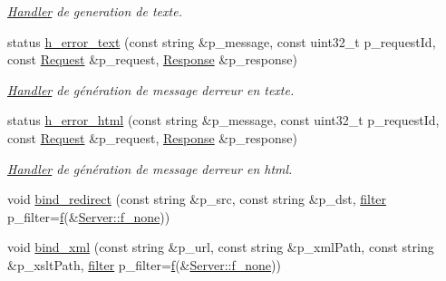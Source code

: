 \begin{DoxyCompactItemize}
\begin{DoxyCompactList}\small\item\em \hyperlink{classxtd_1_1network_1_1http_1_1Server_1_1Handler}{Handler} de generation de texte. \end{DoxyCompactList}\item 
status \hyperlink{classxtd_1_1network_1_1http_1_1Server_ad57a524ff44201af997e2d3557557623}{h\+\_\+error\+\_\+text} (const string \&p\+\_\+message, const uint32\+\_\+t p\+\_\+request\+Id, const \hyperlink{classxtd_1_1network_1_1http_1_1Request}{Request} \&p\+\_\+request, \hyperlink{classxtd_1_1network_1_1http_1_1Response}{Response} \&p\+\_\+response)
\begin{DoxyCompactList}\small\item\em \hyperlink{classxtd_1_1network_1_1http_1_1Server_1_1Handler}{Handler} de génération de message d\textquotesingle{}erreur en texte. \end{DoxyCompactList}\item 
status \hyperlink{classxtd_1_1network_1_1http_1_1Server_a0edee265d48418b258fb450426e10905}{h\+\_\+error\+\_\+html} (const string \&p\+\_\+message, const uint32\+\_\+t p\+\_\+request\+Id, const \hyperlink{classxtd_1_1network_1_1http_1_1Request}{Request} \&p\+\_\+request, \hyperlink{classxtd_1_1network_1_1http_1_1Response}{Response} \&p\+\_\+response)
\begin{DoxyCompactList}\small\item\em \hyperlink{classxtd_1_1network_1_1http_1_1Server_1_1Handler}{Handler} de génération de message d\textquotesingle{}erreur en html. \end{DoxyCompactList}\item 
void \hyperlink{classxtd_1_1network_1_1http_1_1Server_a08caadcbcc43f73a1f63364b5dfdbd6b}{bind\+\_\+redirect} (const string \&p\+\_\+src, const string \&p\+\_\+dst, \hyperlink{structxtd_1_1network_1_1http_1_1Server_1_1Handler_1_1filter}{filter} p\+\_\+filter=\hyperlink{classxtd_1_1network_1_1http_1_1Server_a94d4867ec740265b62b7505584387240}{f}(\&\hyperlink{classxtd_1_1network_1_1http_1_1Server_a862d3098ef04ad7c503ab4e6d04a93cf}{Server\+::f\+\_\+none}))
\item 
void \hyperlink{classxtd_1_1network_1_1http_1_1Server_ae8903860178fb48bd136fcb52a14de5b}{bind\+\_\+xml} (const string \&p\+\_\+url, const string \&p\+\_\+xml\+Path, const string \&p\+\_\+xslt\+Path, \hyperlink{structxtd_1_1network_1_1http_1_1Server_1_1Handler_1_1filter}{filter} p\+\_\+filter=\hyperlink{classxtd_1_1network_1_1http_1_1Server_a94d4867ec740265b62b7505584387240}{f}(\&\hyperlink{classxtd_1_1network_1_1http_1_1Server_a862d3098ef04ad7c503ab4e6d04a93cf}{Server\+::f\+\_\+none}))

\end{DoxyCompactItemize}
